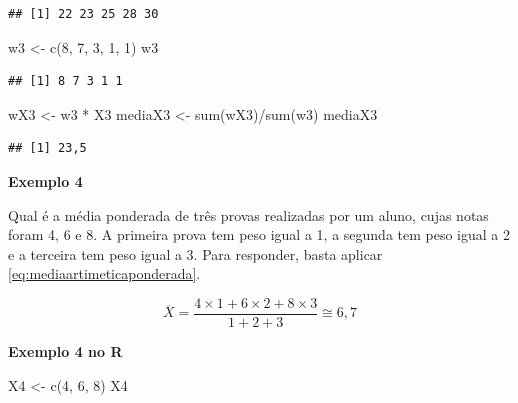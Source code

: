 \documentclass[
]{book}
\newenvironment{Shaded}{\begin{snugshade}}{\end{snugshade}}
\newcommand{\DecValTok}[1]{\textcolor[rgb]{0.00,0.00,0.81}{#1}}
\newcommand{\FunctionTok}[1]{\textcolor[rgb]{0.00,0.00,0.00}{#1}}
\newcommand{\NormalTok}[1]{#1}
\newcommand{\OtherTok}[1]{\textcolor[rgb]{0.56,0.35,0.01}{#1}}
\newcommand{\SpecialCharTok}[1]{\textcolor[rgb]{0.00,0.00,0.00}{#1}}
\begin{document}
\begin{verbatim}
## [1] 22 23 25 28 30
\end{verbatim}

\begin{Shaded}
\begin{Highlighting}[]
\NormalTok{w3 }\OtherTok{\textless{}{-}} \FunctionTok{c}\NormalTok{(}\DecValTok{8}\NormalTok{, }\DecValTok{7}\NormalTok{, }\DecValTok{3}\NormalTok{, }\DecValTok{1}\NormalTok{, }\DecValTok{1}\NormalTok{)}
\NormalTok{w3}
\end{Highlighting}
\end{Shaded}

\begin{verbatim}
## [1] 8 7 3 1 1
\end{verbatim}

\begin{Shaded}
\begin{Highlighting}[]
\NormalTok{wX3 }\OtherTok{\textless{}{-}}\NormalTok{ w3 }\SpecialCharTok{*}\NormalTok{ X3}
\NormalTok{mediaX3 }\OtherTok{\textless{}{-}} \FunctionTok{sum}\NormalTok{(wX3)}\SpecialCharTok{/}\FunctionTok{sum}\NormalTok{(w3)}
\NormalTok{mediaX3}
\end{Highlighting}
\end{Shaded}

\begin{verbatim}
## [1] 23,5
\end{verbatim}

\textbf{Exemplo 4}

Qual é a média ponderada de três provas realizadas por um aluno, cujas notas foram 4, 6 e 8. A primeira prova tem peso igual a 1, a segunda tem peso igual a 2 e a terceira tem peso igual a 3. Para responder, basta aplicar \eqref{eq:mediaartimeticaponderada}.

\begin{equation*}
  \overline{X} = \frac{4 \times 1 + 6 \times 2 + 8 \times 3}{1 + 2 + 3} \cong 6,7
\end{equation*}

\textbf{Exemplo 4 no R}

\begin{Shaded}
\begin{Highlighting}[]
\NormalTok{X4 }\OtherTok{\textless{}{-}} \FunctionTok{c}\NormalTok{(}\DecValTok{4}\NormalTok{, }\DecValTok{6}\NormalTok{, }\DecValTok{8}\NormalTok{)}
\NormalTok{X4}
\end{Highlighting}
\end{Shaded}
\end{document}

